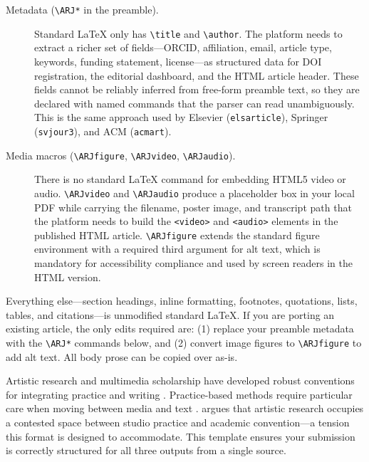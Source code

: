 \begin{description}
  \item[Metadata (\texttt{\textbackslash ARJ*} in the preamble).]
  Standard LaTeX only has \verb|\title| and \verb|\author|. The platform
  needs to extract a richer set of fields---ORCID, affiliation, email,
  article type, keywords, funding statement, license---as structured data
  for DOI registration, the editorial dashboard, and the HTML article
  header. These fields cannot be reliably inferred from free-form preamble
  text, so they are declared with named commands that the parser can read
  unambiguously. This is the same approach used by Elsevier
  (\texttt{elsarticle}), Springer (\texttt{svjour3}), and ACM
  (\texttt{acmart}).

  \item[Media macros (\texttt{\textbackslash ARJfigure},
  \texttt{\textbackslash ARJvideo}, \texttt{\textbackslash ARJaudio}).]
  There is no standard LaTeX command for embedding HTML5 video or audio.
  \verb|\ARJvideo| and \verb|\ARJaudio| produce a placeholder box in your
  local PDF while carrying the filename, poster image, and transcript path
  that the platform needs to build the \verb|<video>| and \verb|<audio>|
  elements in the published HTML article. \verb|\ARJfigure| extends the
  standard figure environment with a required third argument for alt text,
  which is mandatory for accessibility compliance and used by screen
  readers in the HTML version.
\end{description}

Everything else---section headings, inline formatting, footnotes,
quotations, lists, tables, and citations---is unmodified standard
LaTeX. If you are porting an existing article, the only edits required
are: (1) replace your preamble metadata with the \verb|\ARJ*| commands
below, and (2) convert image figures to \verb|\ARJfigure| to add alt
text. All body prose can be copied over as-is.

Artistic research and multimedia scholarship have developed robust
conventions for integrating practice and writing \citep{smith2024art}.
Practice-based methods require particular care when moving between media
and text \citep{brown2022practice}. \citet{borgdorff2012conflict} argues
that artistic research occupies a contested space between studio practice
and academic convention---a tension this format is designed to accommodate.
This template ensures your submission is correctly structured for all three
outputs from a single source.

